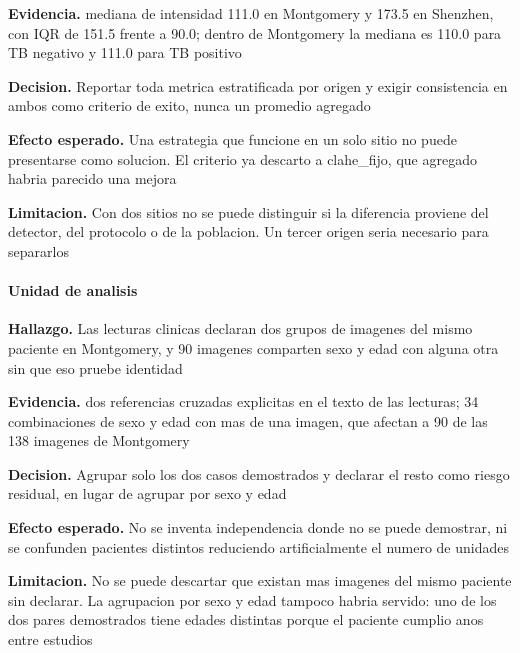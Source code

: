 \textbf{Evidencia.} mediana de intensidad 111.0 en Montgomery y 173.5 en Shenzhen, con IQR de 151.5 frente a 90.0; dentro de Montgomery la mediana es 110.0 para TB negativo y 111.0 para TB positivo

\textbf{Decision.} Reportar toda metrica estratificada por origen y exigir consistencia en ambos como criterio de exito, nunca un promedio agregado

\textbf{Efecto esperado.} Una estrategia que funcione en un solo sitio no puede presentarse como solucion. El criterio ya descarto a clahe\_fijo, que agregado habria parecido una mejora

\textbf{Limitacion.} Con dos sitios no se puede distinguir si la diferencia proviene del detector, del protocolo o de la poblacion. Un tercer origen seria necesario para separarlos

\paragraph{Unidad de analisis}
\textbf{Hallazgo.} Las lecturas clinicas declaran dos grupos de imagenes del mismo paciente en Montgomery, y 90 imagenes comparten sexo y edad con alguna otra sin que eso pruebe identidad

\textbf{Evidencia.} dos referencias cruzadas explicitas en el texto de las lecturas; 34 combinaciones de sexo y edad con mas de una imagen, que afectan a 90 de las 138 imagenes de Montgomery

\textbf{Decision.} Agrupar solo los dos casos demostrados y declarar el resto como riesgo residual, en lugar de agrupar por sexo y edad

\textbf{Efecto esperado.} No se inventa independencia donde no se puede demostrar, ni se confunden pacientes distintos reduciendo artificialmente el numero de unidades

\textbf{Limitacion.} No se puede descartar que existan mas imagenes del mismo paciente sin declarar. La agrupacion por sexo y edad tampoco habria servido: uno de los dos pares demostrados tiene edades distintas porque el paciente cumplio anos entre estudios

